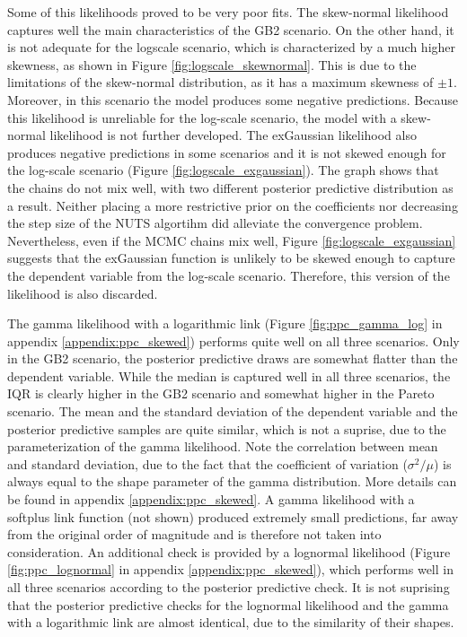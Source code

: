Some of this likelihoods proved to be very poor fits.
The skew-normal likelihood captures well the main characteristics of the GB2 scenario.
On the other hand, it is not adequate for the logscale scenario, which is characterized by a much higher skewness, as shown in Figure \ref{fig:logscale_skewnormal}.
This is due to the limitations of the skew-normal distribution, as it has a maximum skewness of $\pm 1$.
Moreover, in this scenario the model produces some negative predictions.
Because this likelihood is unreliable for the log-scale scenario, the model with a skew-normal likelihood is not further developed.
The exGaussian likelihood also produces negative predictions in some scenarios and it is not skewed enough for the log-scale scenario (Figure \ref{fig:logscale_exgaussian}).
The graph shows that the chains do not mix well, with two different posterior predictive distribution as a result.
Neither placing a more restrictive prior on the coefficients nor decreasing the step size of the NUTS algortihm did alleviate the convergence problem.
Nevertheless, even if the MCMC chains mix well, Figure \ref{fig:logscale_exgaussian} suggests that the exGaussian function is unlikely to be skewed enough to capture the dependent variable from the log-scale scenario.
Therefore, this version of the likelihood is also discarded.

The gamma likelihood with a logarithmic link (Figure \ref{fig:ppc_gamma_log} in appendix \ref{appendix:ppc_skewed}) performs quite well on all three scenarios.
Only in the GB2 scenario, the posterior predictive draws are somewhat flatter than the dependent variable.
While the median is captured well in all three scenarios, the IQR is clearly higher in the GB2 scenario and somewhat higher in the Pareto scenario.
The mean and the standard deviation of the dependent variable and the posterior predictive samples are quite similar, which is not a suprise, due to the parameterization of the gamma likelihood.
Note the correlation between mean and standard deviation, due to the fact that the coefficient of variation ($\sigma^2/\mu $) is always equal to the shape parameter of the gamma distribution.
More details can be found in appendix \ref{appendix:ppc_skewed}.
A gamma likelihood with a softplus link function (not shown) produced extremely small predictions, far away from the original order of magnitude and is therefore not taken into consideration.
An additional check is provided by a lognormal likelihood (Figure \ref{fig:ppc_lognormal} in appendix \ref{appendix:ppc_skewed}), which performs well in all three scenarios according to the posterior predictive check.
It is not suprising that the posterior predictive checks for the lognormal likelihood and the gamma with a logarithmic link are almost identical, due to the similarity of their shapes.

